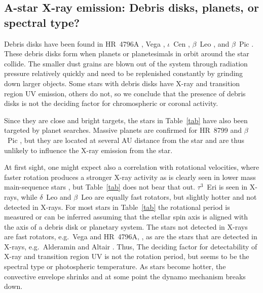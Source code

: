 \documentclass[linenumbers]{aastex631}
\begin{document}
\subsection{A-star  X-ray emission: Debris disks, planets, or spectral type?}
Debris disks have been found in 
HR~4796A \citep[e.g.][]{1991ApJ...383L..79J}, Vega
\citep[e.g.][]{2005ApJ...628..487S}, $\iota$~Cen
\citep[e.g.][]{2011ApJ...736L..32Q}, $\beta$~Leo  \citep[e.g.][]{2021AJ....161..186D}, and
$\beta$~Pic \citep[e.g.][]{2001MNRAS.323..402L}.  These debris disks
form when planets or planetesimals in orbit around the star
collide. The smaller dust grains are blown out of the system through
radiation pressure relatively quickly and need to be replenished
constantly by grinding down larger objects. 
Some stars with debris disks have X-ray and transition region UV emission, others do not, so we conclude that the presence of debris disks is not the deciding factor for chromospheric or coronal activity.

Since they are close and bright targets, the stars in Table~\ref{tab}
have also been targeted by planet searches. Massive planets are
confirmed for HR~8799 \citep{2008Sci...322.1348M} and $\beta$~Pic
\citep[e.g.][]{2021AJ....161..179B}, but they are located at several
AU distance from the star and are thus unlikely to influence the
X-ray emission from the star.

At first sight, one might expect also a correlation with rotational velocities, where faster rotation produces a stronger X-ray activity as is clearly seen in lower mass main-sequence stars \citep{2011ApJ...743...48W}, but Table~\ref{tab} does not bear that out. $\tau^3$~Eri is seen in X-rays, while $\delta$~Leo and $\beta$~Leo are equally fast rotators, but slightly hotter and not detected in X-rays. 
For most stars in Table~\ref{tab} the rotational period is measured  or can be inferred assuming that the stellar spin axis is aligned with the axis of a debris disk or planetary system. The stars not detected in X-rays are fast rotators, e.g.\ Vega \citep[0.68~d for Vega][]{2015A&A...577A..64B} and HR~4796A,  \citep[0.5~d][]{2014ApJ...786..136D}, as are the stars that are detected in X-rays, e.g.\ Alderamin \citep[0.5~d][]{2006ApJ...637..494V} and Altair \citep[0.4~d][]{2006ApJ...636.1087P}. Thus,
The deciding factor for detectability of X-ray and transition region UV is not the rotation period, but seems to be the spectral type or photospheric temperature. As stars become hotter, the convective envelope shrinks and at some point the dynamo mechanism breaks down.
\end{document}
